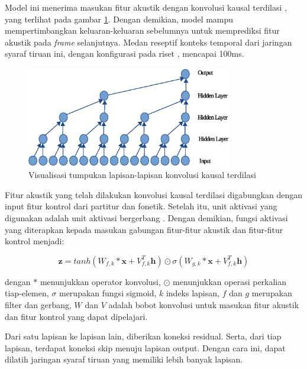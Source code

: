 Model ini menerima masukan fitur akustik dengan konvolusi kausal terdilasi \parencite{Oord2016WaveNetAG}, yang terlihat pada gambar \ref{fig-dilated-cnn}. Dengan demikian, model mampu mempertimbangkan keluaran-keluaran sebelumnya untuk memprediksi fitur akustik pada \textit{frame} selanjutnya. Medan reseptif konteks temporal dari jaringan syaraf tiruan ini, dengan konfigurasi pada riset \citet{bonada2017singing}, mencapai 100ms.

\begin{figure}[h]
    \centering
    \includegraphics[width=0.8\textwidth]{resources/dilated-cnn.eps}
    \caption{Visualisasi tumpukan lapisan-lapisan konvolusi kausal terdilasi \parencite{Oord2016WaveNetAG}}\label{fig-dilated-cnn}
\end{figure}

Fitur akustik yang telah dilakukan konvolusi kausal terdilasi digabungkan dengan input fitur kontrol dari partitur dan fonetik. Setelah itu, unit aktivasi yang digunakan adalah unit aktivasi bergerbang \parencite{Oord2016ConditionalIG}. Dengan demikian, fungsi aktivasi yang diterapkan kepada masukan gabungan fitur-fitur akustik dan fitur-fitur kontrol menjadi:

\begin{equation}
    \mathbf{z} = tanh(W_{f,k}*\mathbf{x}+V^T_{f,k}\mathbf{h})\odot\sigma(W_{g,k}*\mathbf{x}+V^T_{f,k}\mathbf{h})
\end{equation}\label{eq-gated-activation}

dengan $*$ menunjukkan operator konvolusi, $\odot$ menunjukkan operasi perkalian tiap-elemen, $\sigma$ merupakan fungsi sigmoid, $k$ indeks lapisan, $f$ dan $g$ merupakan filter dan gerbang, $W$ dan $V$ adalah bobot konvolusi untuk masukan fitur akustik dan fitur kontrol yang dapat dipelajari.

Dari satu lapisan ke lapisan lain, diberikan koneksi residual. Serta, dari tiap lapisan, terdapat koneksi skip menuju lapisan output. Dengan cara ini, dapat dilatih jaringan syaraf tiruan yang memiliki lebih banyak lapisan. \parencite{He2016DeepRL}

